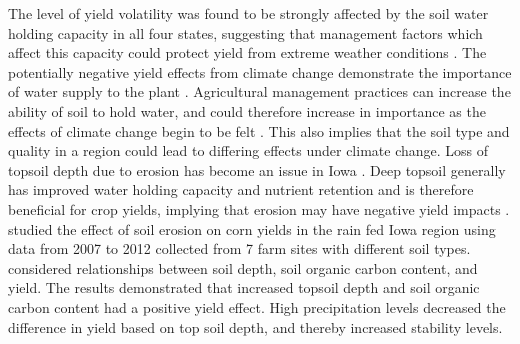 The level of yield volatility was found to be strongly affected by the soil water holding capacity in all four states, suggesting that management factors which affect this capacity could protect yield from extreme weather conditions \citep{williams2016soil}. The potentially negative yield effects from climate change demonstrate the importance of water supply to the plant \citep{williams2016soil}. Agricultural management practices can increase the ability of soil to hold water, and could therefore increase in importance as the effects of climate change begin to be felt \citep{ williams2016soil}. This also implies that the soil type and quality in a region could lead to differing effects under climate change. Loss of topsoil depth due to erosion has become an issue in Iowa \citep{IowaSWCS}. Deep topsoil generally has improved water holding capacity and nutrient retention and is therefore beneficial for crop yields, implying that erosion may have negative yield impacts \citep{lee2015topsoil}. \cite{lee2015topsoil} studied the effect of soil erosion on corn yields in the rain fed Iowa region using data from 2007 to 2012 collected from 7 farm sites with different soil types.	\cite{lee2015topsoil} considered relationships between soil depth, soil organic carbon content, and yield. The results demonstrated that increased topsoil depth and soil organic carbon content had a positive yield effect. High precipitation levels decreased the difference in yield based on top soil depth, and thereby increased stability levels.


